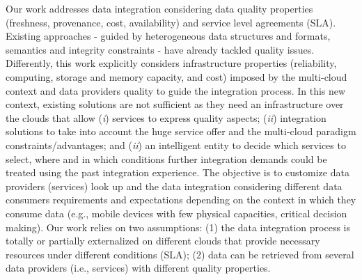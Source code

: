Our work addresses data integration considering data quality properties (freshness, provenance, cost, availability) and service level agreements (SLA). 
%
Existing approaches  - guided by heterogeneous data structures and formats, semantics and integrity constraints - have already tackled quality issues.
%
Differently, this work explicitly considers infrastructure properties (reliability, computing, storage and memory capacity, and cost) imposed by the multi-cloud context and data providers quality to guide the integration process. 
%
In this new context, existing solutions are not sufficient as they need an infrastructure over the clouds that allow 
(\textit{i}) services to express quality aspects; 
(\textit{ii}) integration solutions to take into account the huge service offer and the multi-cloud paradigm constraints/advantages; and
(\textit{ii}) an intelligent entity to decide which services to select, where and in which conditions further integration demands could be treated using the past integration experience. 
%
The objective is to customize data providers (services) look up and the data integration considering different data consumers requirements and expectations depending on the context in which  they consume data (e.g., mobile devices with few physical capacities, critical decision making). Our work relies on two assumptions: (1) the data integration process is totally or partially externalized on different clouds that provide necessary resources under different conditions (SLA); (2) data can be retrieved from several data providers (i.e., services) with different quality properties.

